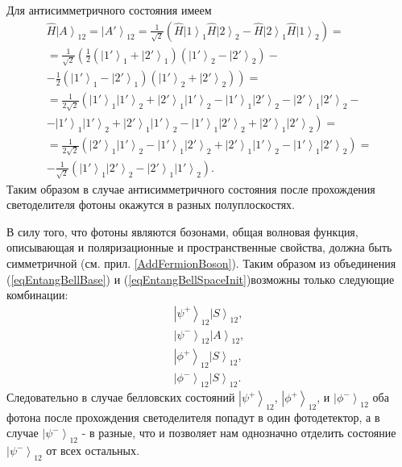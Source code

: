 Для антисимметричного состояния имеем
\begin{eqnarray}
\hat{H}\left|A\right>_{12} = \left|A'\right>_{12} = 
\frac{1}{\sqrt{2}}
\left(
\hat{H}\left|1\right>_1\hat{H}\left|2\right>_2 -
\hat{H}\left|2\right>_1\hat{H}\left|1\right>_2
\right) = 
\nonumber \\
=
\frac{1}{\sqrt{2}}
\left(
\frac{1}{2}
\left(\left|1'\right>_1 +
\left|2'\right>_1\right)
\left(\left|1'\right>_2 -
\left|2'\right>_2\right) -
\right.
\nonumber \\
- \left.
\frac{1}{2}
\left(\left|1'\right>_1 -
\left|2'\right>_1\right)
\left(\left|1'\right>_2 +
\left|2'\right>_2\right)
\right) = 
\nonumber \\
=
\frac{1}{2 \sqrt{2}}
\left(
\left|1'\right>_1 \left|1'\right>_2 +
\left|2'\right>_1 \left|1'\right>_2 -
\left|1'\right>_1 \left|2'\right>_2 -
\left|2'\right>_1 \left|2'\right>_2 -
\right. 
\nonumber \\
- \left.
\left|1'\right>_1 \left|1'\right>_2 +
\left|2'\right>_1 \left|1'\right>_2 -
\left|1'\right>_1 \left|2'\right>_2 +
\left|2'\right>_1 \left|2'\right>_2
\right) =
\nonumber \\
=
\frac{1}{2 \sqrt{2}}
\left(
\left|2'\right>_1 \left|1'\right>_2 
- \left|1'\right>_1 \left|2'\right>_2 
+ \left|2'\right>_1 \left|1'\right>_2 
- \left|1'\right>_1 \left|2'\right>_2
\right) = 
\nonumber \\
- \frac{1}{\sqrt{2}}
\left(
\left|1'\right>_1 \left|2'\right>_2 
- \left|2'\right>_1 \left|1'\right>_2 
\right).
\nonumber
\end{eqnarray}
Таким образом в случае антисимметричного состояния после прохождения
светоделителя фотоны окажутся в разных полуплоскостях.

В силу того, что фотоны являются бозонами, общая волновая функция,
описывающая и поляризационные и пространственные свойства,
должна быть симметричной \cite{bFeinman}
(см. прил. \ref{AddFermionBoson}). Таким образом из объединения 
(\ref{eqEntangBellBase}) и (\ref{eqEntangBellSpaceInit})возможны
только следующие комбинации:
\begin{eqnarray}
\left|\psi^{+}\right>_{12}\left|S\right>_{12},
\nonumber \\ 
\left|\psi^{-}\right>_{12}\left|A\right>_{12}, 
\nonumber \\ 
\left|\phi^{+}\right>_{12}\left|S\right>_{12}, 
\nonumber \\ 
\left|\phi^{-}\right>_{12}\left|S\right>_{12}.
\nonumber
\end{eqnarray}
Следовательно в случае белловских состояний 
$\left|\psi^{+}\right>_{12}$, $\left|\phi^{+}\right>_{12}$, и
$\left|\phi^{-}\right>_{12}$ оба фотона после прохождения
светоделителя попадут в один фотодетектор, а в случае
$\left|\psi^{-}\right>_{12}$ - в разные, что и позволяет нам
однозначно отделить состояние $\left|\psi^{-}\right>_{12}$ от всех
остальных. 

